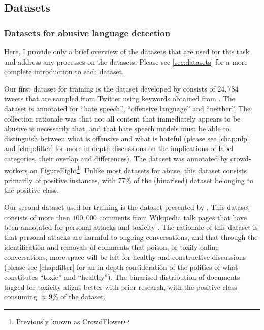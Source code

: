 \subsection{Datasets}\label{sec:datasets}


\subsubsection{Datasets for abusive language detection}\label{sub:abuse_data}


Here, I provide only a brief overview of the datasets that are used for this task and address any processes on the datasets. Please see \autoref{sec:datasets} for a more complete introduction to each dataset.

Our first dataset for training is the dataset developed by \citet{Davidson:2017} consists of $24,784$ tweets that are sampled from Twitter using keywords obtained from \citet{Hatebase}. The dataset is annotated for ``hate speech'', ``offensive language'' and ``neither''. The collection rationale was that not all content that immediately appears to be abusive is necessarily that, and that hate speech models must be able to distinguish between what is offensive and what is hateful \cite{Davidson:2017} (please see \autoref{chap:nlp} and \autoref{chap:filter} for more in-depth discussions on the implications of label categories, their overlap and differences). The dataset was annotated by crowd-workers on FigureEight\footnote{Previously known as CrowdFlower}. Unlike most datasets for abuse, this dataset consists primarily of positive instances, with $77$\% of the (binarised) dataset belonging to the positive class.

Our second dataset used for training is the dataset presented by \citet{Wulczyn:2017}. This dataset consists of more then $100,000$ comments from Wikipedia talk pages that have been annotated for personal attacks and toxicity \cite{Wulczyn:2017}. The rationale of this dataset is that personal attacks are harmful to ongoing conversations, and that through the identification and removals of comments that poison, or toxify online conversations, more space will be left for healthy and constructive discussions (please see \autoref{chap:filter} for an in-depth consideration of the politics of what constitutes ``toxic'' and ``healthy''). The binarised distribution of documents tagged for toxicity aligns better with prior research, with the positive class consuming $\approx 9$\% of the dataset.

